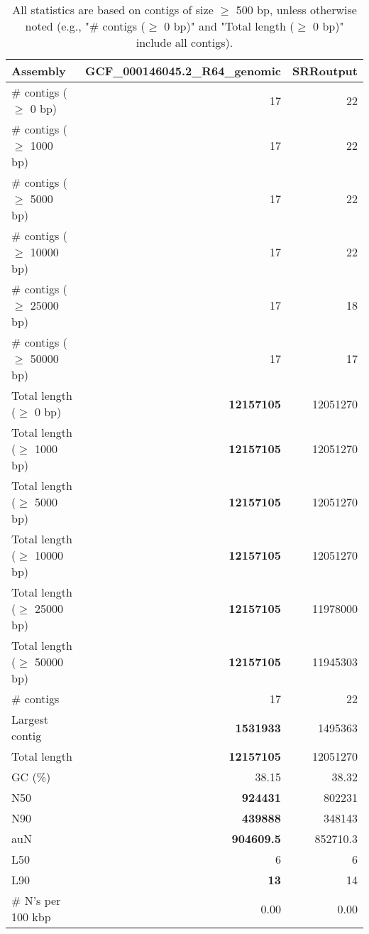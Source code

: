 \documentclass[12pt,a4paper]{article}
\begin{document}
\begin{table}[ht]
\begin{center}
\caption{All statistics are based on contigs of size $\geq$ 500 bp, unless otherwise noted (e.g., "\# contigs ($\geq$ 0 bp)" and "Total length ($\geq$ 0 bp)" include all contigs).}
\begin{tabular}{|l*{2}{|r}|}
\hline
Assembly & GCF\_000146045.2\_R64\_genomic & SRRoutput \\ \hline
\# contigs ($\geq$ 0 bp) & 17 & 22 \\ \hline
\# contigs ($\geq$ 1000 bp) & 17 & 22 \\ \hline
\# contigs ($\geq$ 5000 bp) & 17 & 22 \\ \hline
\# contigs ($\geq$ 10000 bp) & 17 & 22 \\ \hline
\# contigs ($\geq$ 25000 bp) & 17 & 18 \\ \hline
\# contigs ($\geq$ 50000 bp) & 17 & 17 \\ \hline
Total length ($\geq$ 0 bp) & {\bf 12157105} & 12051270 \\ \hline
Total length ($\geq$ 1000 bp) & {\bf 12157105} & 12051270 \\ \hline
Total length ($\geq$ 5000 bp) & {\bf 12157105} & 12051270 \\ \hline
Total length ($\geq$ 10000 bp) & {\bf 12157105} & 12051270 \\ \hline
Total length ($\geq$ 25000 bp) & {\bf 12157105} & 11978000 \\ \hline
Total length ($\geq$ 50000 bp) & {\bf 12157105} & 11945303 \\ \hline
\# contigs & 17 & 22 \\ \hline
Largest contig & {\bf 1531933} & 1495363 \\ \hline
Total length & {\bf 12157105} & 12051270 \\ \hline
GC (\%) & 38.15 & 38.32 \\ \hline
N50 & {\bf 924431} & 802231 \\ \hline
N90 & {\bf 439888} & 348143 \\ \hline
auN & {\bf 904609.5} & 852710.3 \\ \hline
L50 & 6 & 6 \\ \hline
L90 & {\bf 13} & 14 \\ \hline
\# N's per 100 kbp & 0.00 & 0.00 \\ \hline
\end{tabular}
\end{center}
\end{table}
\end{document}
